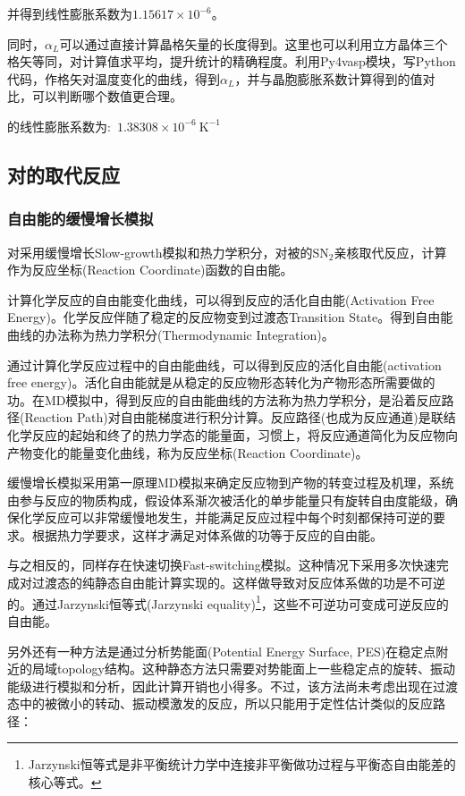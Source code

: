 并得到线性膨胀系数为$1.15617\times10^{-6}$。

同时，$\alpha_L$可以通过直接计算晶格矢量的长度得到。这里也可以利用立方晶体三个格矢等同，对计算值求平均，提升统计的精确程度。利用\textrm{Py4vasp}模块，写\textrm{Python}代码，作格矢对温度变化的曲线，得到$\alpha_L$，并与晶胞膨胀系数计算得到的值对比，可以判断哪个数值更合理。

的线性膨胀系数为:~$1.38308\times10^{-6}~\mathrm{K}^{-1}$

\subsection{对的取代反应}
\subsubsection{自由能的缓慢增长模拟}
对采用缓慢增长\textrm{Slow-growth}模拟和热力学积分，对被的$\mathrm{SN}_2$亲核取代反应，计算作为反应坐标\textrm{(Reaction Coordinate)}函数的自由能。

计算化学反应的自由能变化曲线，可以得到反应的活化自由能\textrm{(Activation Free Energy)}。化学反应伴随了稳定的反应物变到过渡态\textrm{Transition State}。得到自由能曲线的办法称为热力学积分\textrm{(Thermodynamic Integration)}。

通过计算化学反应过程中的自由能曲线，可以得到反应的活化自由能\textrm{(activation free energy)}。活化自由能就是从稳定的反应物形态转化为产物形态所需要做的功。在\textrm{MD}模拟中，得到反应的自由能曲线的方法称为热力学积分，是沿着反应路径\textrm{(Reaction Path)}对自由能梯度进行积分计算。反应路径(也成为反应通道)是联结化学反应的起始和终了的热力学态的能量面，习惯上，将反应通道简化为反应物向产物变化的能量变化曲线，称为反应坐标\textrm{(Reaction Coordinate)}。

缓慢增长模拟采用第一原理\textrm{MD}模拟来确定反应物到产物的转变过程及机理，系统由参与反应的物质构成，假设体系渐次被活化的单步能量只有旋转自由度能级，确保化学反应可以非常缓慢地发生，并能满足反应过程中每个时刻都保持可逆的要求。根据热力学要求，这样才满足对体系做的功等于反应的自由能。

与之相反的，同样存在快速切换\textrm{Fast-switching}模拟。这种情况下采用多次快速完成对过渡态的纯静态自由能计算实现的。这样做导致对反应体系做的功是不可逆的。通过\textrm{Jarzynski}恒等式\textrm{(Jarzynski equality)}\footnote{\textrm{Jarzynski}恒等式是非平衡统计力学中连接非平衡做功过程与平衡态自由能差的核心等式。}，这些不可逆功可变成可逆反应的自由能。

另外还有一种方法是通过分析势能面\textrm{(Potential Energy Surface, PES)}在稳定点附近的局域\textrm{topology}结构。这种静态方法只需要对势能面上一些稳定点的旋转、振动能级进行模拟和分析，因此计算开销也小得多。不过，该方法尚未考虑出现在过渡态中的被微小的转动、振动模激发的反应，所以只能用于定性估计类似的反应路径：

